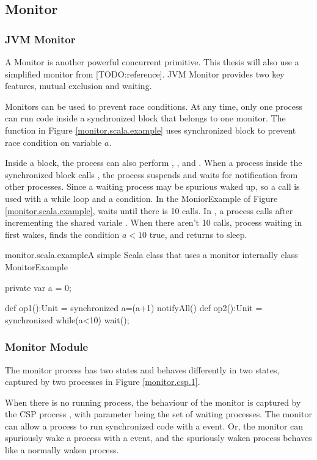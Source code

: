 \documentclass[a4paper, 12pt]{article}
\begin{document}
\subsection{Monitor}
\subsubsection{JVM Monitor}
A Monitor is another powerful concurrent primitive. This thesis will also use a simplified monitor from [TODO:reference]. JVM Monitor provides two key features, mutual exclusion and waiting. 

Monitors can be used to prevent race conditions. At any time, only one process can run code inside a synchronized block that belongs to one monitor. The function  in Figure \ref{monitor.scala.example} uses synchronized block to prevent race condition on variable $a$. 

Inside a  block, the process can also perform , , and . When a process inside the synchronized block calls , the process suspends and waits for notification from other processes. Since a waiting process may be spurious waked up, so a  call is used with a while loop and a condition. In the MoniorExample of Figure \ref{monitor.scala.example},  waits until there is 10  calls. In , a process calls  after incrementing the shared variale . When there aren't 10  calls, process waiting in  first wakes, finds the condition $a<10$ true, and returns to sleep. 


\begin{scalainline}{monitor.scala.example}{A simple Scala class that uses a monitor internally}
class MonitorExample {
  private var a = 0;

  def op1():Unit = synchronized{ 
    a=(a+1)%
    notifyAll()
  }
  def op2():Unit = synchronized{ 
    while(a<10) wait();
  }
}
\end{scalainline}
  
\subsubsection{Monitor Module}
The monitor process has two states and behaves differently in two states, captured by two processes in Figure \ref{monitor.csp.1}.

When there is no running process, the behaviour of the monitor is captured by the CSP process , with parameter  being the set of waiting processes. The monitor can allow a process to run synchronized code with a  event. Or, the monitor can spuriously wake a process with a  event, and the spuriously waken process behaves like a normally waken process.
\end{document}
